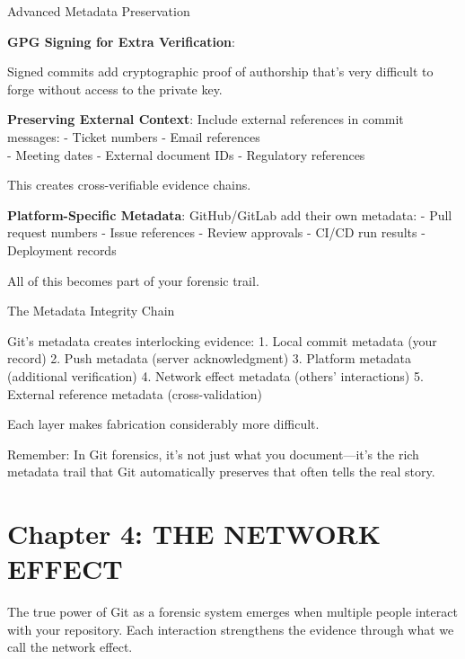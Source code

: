 Advanced Metadata Preservation

\textbf{GPG Signing for Extra Verification}:

\begin{Shaded}
\begin{Highlighting}[]
  
\end{Highlighting}
\end{Shaded}

Signed commits add cryptographic proof of authorship that's very
difficult to forge without access to the private key.

\textbf{Preserving External Context}: Include external references in
commit messages: - Ticket numbers - Email references\\
- Meeting dates - External document IDs - Regulatory references

This creates cross-verifiable evidence chains.

\textbf{Platform-Specific Metadata}: GitHub/GitLab add their own
metadata: - Pull request numbers - Issue references - Review approvals -
CI/CD run results - Deployment records

All of this becomes part of your forensic trail.

The Metadata Integrity Chain

Git's metadata creates interlocking evidence: 1. Local commit metadata
(your record) 2. Push metadata (server acknowledgment) 3. Platform
metadata (additional verification) 4. Network effect metadata (others'
interactions) 5. External reference metadata (cross-validation)

Each layer makes fabrication considerably more difficult.

Remember: In Git forensics, it's not just what you document---it's the
rich metadata trail that Git automatically preserves that often tells
the real story.

\section{Chapter 4: THE NETWORK
EFFECT}\label{chapter-4-the-network-effect}

The true power of Git as a forensic system emerges when multiple people
interact with your repository. Each interaction strengthens the evidence
through what we call the network effect.

